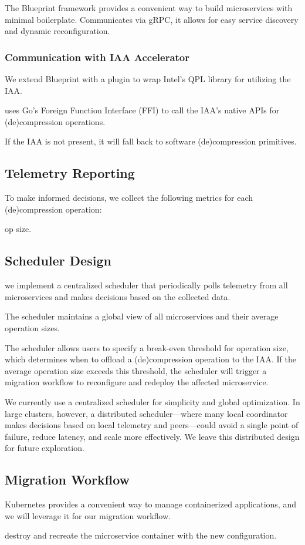 The Blueprint framework provides a convenient way to build microservices with minimal boilerplate.
Communicates via gRPC, it allows for easy service discovery and dynamic reconfiguration.

\subsubsection{Communication with IAA Accelerator}

We extend Blueprint with a plugin to wrap Intel's QPL library for utilizing the IAA.

uses Go's Foreign Function Interface (FFI) to call the IAA's native APIs for (de)compression operations.

If the IAA is not present, it will fall back to software (de)compression primitives.

\subsection{Telemetry Reporting}

To make informed decisions, we collect the following metrics for each (de)compression operation:

op size.


\subsection{Scheduler Design}

we implement a centralized scheduler that periodically polls telemetry from all microservices and makes decisions based on the collected data.

The scheduler maintains a global view of all microservices and their average operation sizes.

The scheduler allows users to specify a break-even threshold for operation size, which determines when to offload a (de)compression operation to the IAA.
If the average operation size exceeds this threshold, the scheduler will trigger a migration workflow to reconfigure and redeploy the affected microservice.

We currently use a centralized scheduler for simplicity and global optimization.
In large clusters, however, a distributed scheduler---where many local coordinator makes decisions based on local telemetry and peers---could avoid a single point of failure, reduce latency, and scale more effectively.
We leave this distributed design for future exploration.

\subsection{Migration Workflow}

Kubernetes provides a convenient way to manage containerized applications, and we will leverage it for our migration workflow.

destroy and recreate the microservice container with the new configuration.
